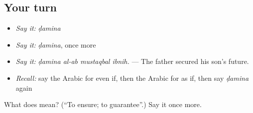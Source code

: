 \subsection*{Your turn}
\begin{itemize}
\raggedright
  \item \emph{Say it:} \emph{ḍamina}
  \item \emph{Say it:} \emph{ḍamina}, once more
  \item \emph{Say it:} \emph{ḍamina al-ab mustaqbal ibnih.} — The father secured his son's future.
  \item \emph{Recall:} say the Arabic for even if, then the Arabic for as if, then say \emph{ḍamina} again
\end{itemize}

\begin{tcolorbox}[breakable,colback=teal!4,colframe=teal!35!black,title={Before you move on}]
What does  mean? (\textquotedblleft{}To ensure; to guarantee\textquotedblright{}.) Say it once more.
\end{tcolorbox}
